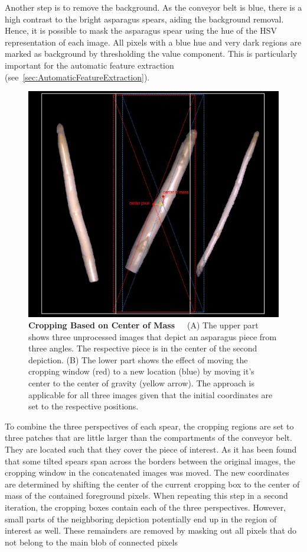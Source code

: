 Another step is to remove the background. As the conveyor belt is blue, there is a high contrast to the bright asparagus spears, aiding the background removal. Hence, it is possible to mask the asparagus spear using the hue of the HSV representation of each image. All pixels with a blue hue and very dark regions are marked as background by thresholding the value component. This is particularly important for the automatic feature extraction (see~\autoref{sec:AutomaticFeatureExtraction}).

\begin{figure}[!ht]
	\centering
	\includegraphics[scale=0.4]{Figures/chapter03/preprocessing_cropping.png}
	\decoRule
	\caption[Cropping Based on Center of Mass]{\textbf{Cropping Based on Center of Mass}~~~(A) The upper part shows three unprocessed images that depict an asparagus piece from three angles. The respective piece is in the center of the second depiction. (B) The lower part shows the effect of moving the cropping window (red) to a new location (blue) by moving it's center to the center of gravity (yellow arrow). The approach is applicable for all three images given that the initial coordinates are set to the respective positions.}
	\label{fig:PreprocessingCropping}
\end{figure}

To combine the three perspectives of each spear, the cropping regions are set to three patches that are little larger than the compartments of the conveyor belt. They are located such that they cover the piece of interest. As it has been found that some tilted spears span across the borders between the original images, the cropping window in the concatenated images was moved. The new coordinates are determined by shifting the center of the current cropping box to the center of mass of the contained foreground pixels. When repeating this step in a second iteration, the cropping boxes contain each of the three perspectives. However, small parts of the neighboring depiction potentially end up in the region of interest as well. These remainders are removed by masking out all pixels that do not belong to the main blob of connected pixels

